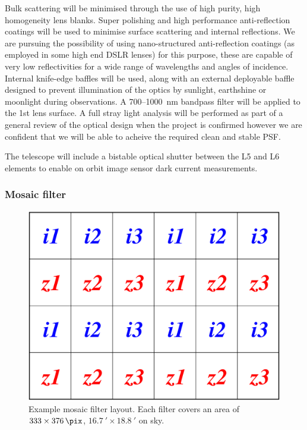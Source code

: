 \documentclass[]{iac}
\begin{document}
Bulk scattering will be minimised through the use of high purity, high homogeneity lens blanks. Super polishing and high
performance anti-reflection coatings will be used to minimise surface scattering and internal reflections. We are
pursuing the possibility of using nano-structured anti-reflection coatings (as employed in some high end DSLR lenses)
for this purpose, these are capable of very low reflectivities for a wide range of wavelengths and angles of incidence.
Internal knife-edge baffles will be used, along with an external deployable baffle designed to prevent illumination of
the optics by sunlight, earthshine or moonlight during observations. A 700--\SI{1000}{\nano\metre} bandpass filter will
be applied to the 1st lens surface. A full stray light analysis will be performed as part of a general review of the
optical design when the project is confirmed however we are confident that we will be able to acheive the required clean
and stable PSF.

The telescope will include a bistable optical shutter between the L5 and L6 elements to enable on orbit image sensor
dark current measurements.

\subsubsection{Mosaic filter}
\label{sec:mosaic}

\begin{figure}[tp]
  \center \includegraphics[width=0.7\columnwidth]{figures/mosaic.pdf}
  \caption{\label{fig:mosaic}Example mosaic filter layout. Each filter covers an area of $333 \times \SI{376}{\pix}$,
    $\SI{16.7}{\arcminute} \times \SI{18.8}{\arcminute}$ on sky.}
\end{figure}
\end{document}

